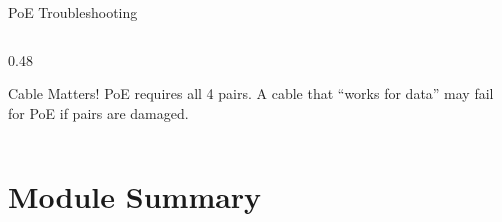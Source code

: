 \documentclass[aspectratio=169]{beamer}  %
\begin{document}
\begin{frame}{PoE Troubleshooting}
\begin{columns}[T]
\begin{column}{0.48\textwidth}
            \vspace{0.3em}
            \begin{alertblock}{Cable Matters!}
                PoE requires all 4 pairs. A cable that ``works for data'' may fail for PoE if pairs are damaged.
            \end{alertblock}
        \end{column}
    \end{columns}
\end{frame}

\section*{Module Summary}
\end{document}
